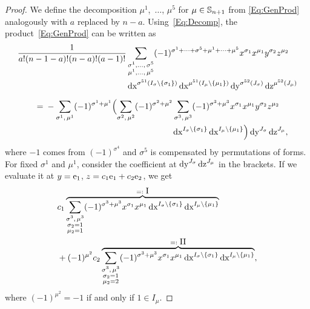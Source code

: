 \documentclass[\MainFolder/Text.tex]{subfiles}
\begin{document}
\begin{proof}
We define the decomposition $\mu^1$,~$\dotsc$, $\mu^5$ for $\mu\in \mathbb{S}_{n+1}$ from \eqref{Eq:GenProd} analogously with $a$ replaced by $n-a$.
Using~\eqref{Eq:Decomp}, the product~\eqref{Eq:GenProd} can be written as
\begin{align*}
  &\begin{multlined}\frac{1}{a! (n-1-a)! (n-a)! (a-1)!} \sum_{\substack{\sigma^1,  \dotsc,\, \sigma^5 \\ \mu^1, \dotsc,\, \mu^5}} (-1)^{\sigma^1 + \dotsb + \sigma^5 + \mu^1 + \dotsb + \mu^5} x^{\sigma_1} x^{\mu_1} y^{\sigma_2} z^{\mu_2} \\ \Diff{x}^{\sigma^{51}(I_\sigma\backslash \{\sigma_1\})} \Diff{x}^{\mu^{51}(I_\mu\backslash\{\mu_1\})} \Diff{y}^{\sigma^{52}(J_\sigma)} \Diff{z}^{\mu^{52}(J_\mu)} \end{multlined} \\[5pt]
 &\qquad =\begin{multlined}[t]- \sum_{\sigma^1,\, \mu^1} (-1)^{\sigma^1 + \mu^1} \Bigl(\sum_{\sigma^2,\, \mu^2} (-1)^{\sigma^2 + \mu^2} \sum_{\sigma^3,\, \mu^3} (-1)^{\sigma^3 + \mu^3} x^{\sigma_1} x^{\mu_1} y^{\sigma_2} z^{\mu_2} \\ \Diff{x}^{I_\sigma \backslash \{\sigma_1\}} \Diff{x}^{I_\mu\backslash \{\mu_1\}}\Bigr) \Diff{y}^{J_\sigma} \Diff{z}^{J_\mu},\end{multlined} \end{align*}
where $-1$ comes from $(-1)^{\sigma^4}$ and $\sigma^5$ is compensated by permutations of forms.
For fixed $\sigma^1$ and $\mu^1$, consider the coefficient at $\operatorname{dy}^{J_\sigma}\operatorname{dz}^{J_\mu}$ in the brackets.
If we evaluate it at $y=\mathrm{e}_1$, $z=c_1 \mathrm{e}_1 + c_2 \mathrm{e}_2$, we get
\begin{align*}
&  c_1 \overbrace{\sum_{\substack{\sigma^3,\, \mu^3 \\ \sigma_2 = 1 \\ \mu_2 = 1}} (-1)^{\sigma^3 + \mu^3} x^{\sigma_1} x^{\mu_1}  \operatorname{dx}^{I_\sigma\backslash\{\sigma_1\}} \operatorname{dx}^{I_\mu \backslash\{\mu_1\}}}^{=:\displaystyle\mathrm{I}} \\ 
& {} + (-1)^{\mu^2} c_2  \overbrace{\sum_{\substack{\sigma^3,\, \mu^3 \\ \sigma_2 = 1 \\ \mu_2 = 2}} (-1)^{\sigma^3 + \mu^3} x^{\sigma_1} x^{\mu_1}  \operatorname{dx}^{I_\sigma\backslash\{\sigma_1\}} \operatorname{dx}^{I_\mu \backslash\{\mu_1\}}}^{=:\displaystyle\mathrm{II}},
 \end{align*}
where $(-1)^{\mu^2} = -1$ if and only if $1\in I_{\mu}$.


\end{proof}
\end{document}
